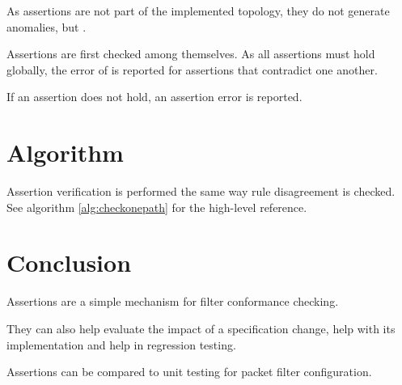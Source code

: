 As assertions are not part of the implemented topology, they do not generate
anomalies, but .

Assertions are first checked among themselves. As all assertions must hold
globally, the error of
 is reported for assertions that contradict one
another.

If an assertion does not hold, an assertion  error is
reported.



\section{Algorithm}

Assertion verification is performed the same way rule disagreement is checked.
See algorithm \ref{alg:checkonepath} for the high-level reference.



\section{Conclusion}

Assertions are a simple mechanism for filter conformance checking.

They can also help evaluate the impact of a specification change, help
with its implementation and help in regression testing.

Assertions can be compared to unit testing for packet filter configuration.




